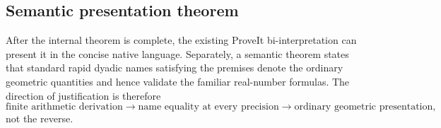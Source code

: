\subsection{Semantic presentation theorem}

After the internal theorem is complete, the existing ProveIt
bi-interpretation can present it in the concise native language.  Separately,
a semantic theorem states that standard rapid dyadic names satisfying the
premises denote the ordinary geometric quantities and hence validate the
familiar real-number formulas.  The direction of justification is therefore
\[
 \text{finite arithmetic derivation}
 \longrightarrow
 \text{name equality at every precision}
 \longrightarrow
 \text{ordinary geometric presentation},
\]
not the reverse.
